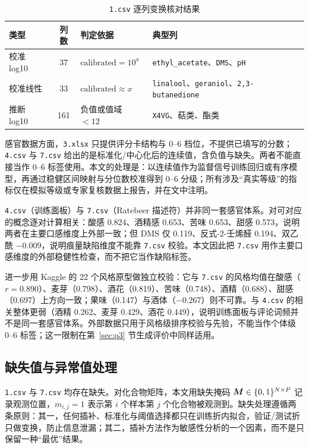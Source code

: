 \begin{table}[htbp]
  \centering
  \caption{\texttt{1.csv} 逐列变换核对结果}
  \label{tab:transform-summary}
  \small
  \begin{tabular}{@{}l c l l@{}}
    \toprule
    类型 & 列数 & 判定依据 & 典型列 \\
    \midrule
    校准 log10 & 37 & $\text{calibrated}=10^{x}$ & \texttt{ethyl\_acetate}、\texttt{DMS}、\texttt{pH} \\
    校准线性 & 33 & $\text{calibrated}\approx x$ & \texttt{linalool}、\texttt{geraniol}、\texttt{2,3-butanedione} \\
    推断 log10 & 161 & 负值或值域 $<12$ & \texttt{X4VG}、萜类、酯类 \\
    \bottomrule
  \end{tabular}
\end{table}

感官数据方面，\texttt{3.xlsx} 只提供评分卡结构与 0--6 档位，不提供已填写的分数；\texttt{4.csv} 与 \texttt{7.csv} 给出的是标准化/中心化后的连续值，含负值与缺失。两者不能直接当作 0--6 标签使用。本文的处理是：以连续值作为监督信号训练回归或有序模型，再通过稳健区间映射与分位数校准得到 0--6 分级；所有涉及“真实等级”的指标仅在模拟等级或专家复核数据上报告，并在文中注明。

\texttt{4.csv}（训练面板）与 \texttt{7.csv}（Ratebeer 描述符）并非同一套感官体系。对可对应的概念逐对计算相关：酸感 0.824、酒精感 0.653、苦味 0.653、甜感 0.573，说明两者在主要口感维度上外部一致；但 DMS 仅 0.119、反式-2-壬烯醛 0.194、双乙酰 $-0.009$，说明痕量缺陷维度不能靠 \texttt{7.csv} 校验。本文因此把 \texttt{7.csv} 用作主要口感维度的外部稳健性检查，而不把它当作缺陷标签。

进一步用 Kaggle 的 22 个风格原型做独立校验：它与 \texttt{7.csv} 的风格均值在酸感（$r=0.890$）、麦芽（0.798）、酒花（0.819）、苦味（0.748）、酒精（0.688）、甜感（0.697）上方向一致；果味（0.147）与酒体（$-0.267$）则不可靠。与 \texttt{4.csv} 的相关整体更弱（酒精 0.262、麦芽 0.429、酒花 0.449），说明训练面板与评论词频并不是同一套感官体系。外部数据只用于风格级排序校验与先验，不能当作个体级 0--6 标签；这一限制在第~\ref{sec:q3} 节生成评价中同样适用。

\subsection{缺失值与异常值处理}

\texttt{1.csv} 与 \texttt{7.csv} 均存在缺失。对化合物矩阵，本文用缺失掩码 $\bm{M}\in\{0,1\}^{N\times P}$ 记录观测位置，$m_{i,j}=1$ 表示第 $i$ 个样本第 $j$ 个化合物被观测到。缺失处理遵循两条原则：其一，任何插补、标准化与阈值选择都只在训练折内拟合，验证/测试折只做变换，防止信息泄漏；其二，插补方法作为敏感性分析的一个因素，而不是只保留一种“最优”结果。

